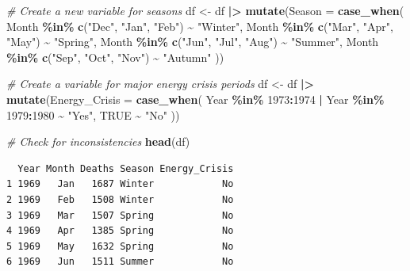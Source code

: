 \documentclass[
  10t,
]{article}
\newenvironment{Shaded}{\begin{snugshade}}{\end{snugshade}}
\newcommand{\AttributeTok}[1]{\textcolor[rgb]{0.13,0.29,0.53}{#1}}
\newcommand{\CommentTok}[1]{\textcolor[rgb]{0.56,0.35,0.01}{\textit{#1}}}
\newcommand{\ConstantTok}[1]{\textcolor[rgb]{0.56,0.35,0.01}{#1}}
\newcommand{\DecValTok}[1]{\textcolor[rgb]{0.00,0.00,0.81}{#1}}
\newcommand{\FunctionTok}[1]{\textcolor[rgb]{0.13,0.29,0.53}{\textbf{#1}}}
\newcommand{\NormalTok}[1]{#1}
\newcommand{\OtherTok}[1]{\textcolor[rgb]{0.56,0.35,0.01}{#1}}
\newcommand{\SpecialCharTok}[1]{\textcolor[rgb]{0.81,0.36,0.00}{\textbf{#1}}}
\newcommand{\StringTok}[1]{\textcolor[rgb]{0.31,0.60,0.02}{#1}}
\begin{document}
\begin{Shaded}
\begin{Highlighting}[]
\CommentTok{\# Create a new variable for seasons}
\NormalTok{df }\OtherTok{\textless{}{-}}\NormalTok{ df }\SpecialCharTok{|\textgreater{}}
  \FunctionTok{mutate}\NormalTok{(}\AttributeTok{Season =} \FunctionTok{case\_when}\NormalTok{(}
\NormalTok{    Month }\SpecialCharTok{\%in\%} \FunctionTok{c}\NormalTok{(}\StringTok{"Dec"}\NormalTok{, }\StringTok{"Jan"}\NormalTok{, }\StringTok{"Feb"}\NormalTok{) }\SpecialCharTok{\textasciitilde{}} \StringTok{"Winter"}\NormalTok{,}
\NormalTok{    Month }\SpecialCharTok{\%in\%} \FunctionTok{c}\NormalTok{(}\StringTok{"Mar"}\NormalTok{, }\StringTok{"Apr"}\NormalTok{, }\StringTok{"May"}\NormalTok{) }\SpecialCharTok{\textasciitilde{}} \StringTok{"Spring"}\NormalTok{,}
\NormalTok{    Month }\SpecialCharTok{\%in\%} \FunctionTok{c}\NormalTok{(}\StringTok{"Jun"}\NormalTok{, }\StringTok{"Jul"}\NormalTok{, }\StringTok{"Aug"}\NormalTok{) }\SpecialCharTok{\textasciitilde{}} \StringTok{"Summer"}\NormalTok{,}
\NormalTok{    Month }\SpecialCharTok{\%in\%} \FunctionTok{c}\NormalTok{(}\StringTok{"Sep"}\NormalTok{, }\StringTok{"Oct"}\NormalTok{, }\StringTok{"Nov"}\NormalTok{) }\SpecialCharTok{\textasciitilde{}} \StringTok{"Autumn"}
\NormalTok{  ))}

\CommentTok{\# Create a variable for major energy crisis periods}
\NormalTok{df }\OtherTok{\textless{}{-}}\NormalTok{ df }\SpecialCharTok{|\textgreater{}}
  \FunctionTok{mutate}\NormalTok{(}\AttributeTok{Energy\_Crisis =} \FunctionTok{case\_when}\NormalTok{(}
\NormalTok{    Year }\SpecialCharTok{\%in\%} \DecValTok{1973}\SpecialCharTok{:}\DecValTok{1974} \SpecialCharTok{|}\NormalTok{ Year }\SpecialCharTok{\%in\%} \DecValTok{1979}\SpecialCharTok{:}\DecValTok{1980} \SpecialCharTok{\textasciitilde{}} \StringTok{"Yes"}\NormalTok{,}
    \ConstantTok{TRUE} \SpecialCharTok{\textasciitilde{}} \StringTok{"No"}
\NormalTok{  ))}

\CommentTok{\# Check for inconsistencies}
\FunctionTok{head}\NormalTok{(df)}
\end{Highlighting}
\end{Shaded}

\begin{verbatim}
  Year Month Deaths Season Energy_Crisis
1 1969   Jan   1687 Winter            No
2 1969   Feb   1508 Winter            No
3 1969   Mar   1507 Spring            No
4 1969   Apr   1385 Spring            No
5 1969   May   1632 Spring            No
6 1969   Jun   1511 Summer            No
\end{verbatim}
\end{document}
